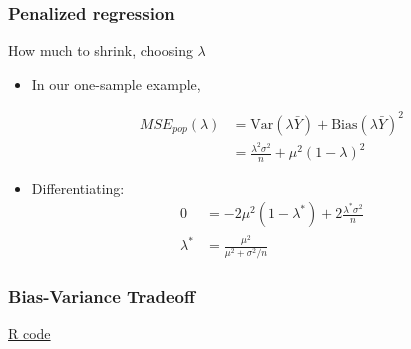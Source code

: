 \documentclass[handout]{beamer}
\newcommand{\V}{\text{Var}}
\begin{document}

   \begin{frame} \frametitle{Penalized regression}

   \begin{block}
         {How much to shrink, choosing $\lambda$}
         \begin{itemize}
         \item In our one-sample example,

   $$
   \begin{aligned}
   MSE_{pop}(\lambda) &= \V( \lambda \bar{Y}) + \text{Bias}(\lambda \bar{Y})^2 \\
   &= \frac{\lambda^2 \sigma^2}{n} + \mu^2 (1 - \lambda)^2
   \end{aligned}
   $$

   \item Differentiating:
   $$
   \begin{aligned}
   0 &= -2 \mu^2(1 - \lambda^*) + 2 \frac{\lambda^* \sigma^2}{n}  \\
   \lambda^* & = \frac{\mu^2}{\mu^2+\sigma^2/n}
   \end{aligned}
   $$
         \end{itemize}
   \end{block}
   \end{frame}



   \begin{frame}
   \frametitle{Bias-Variance Tradeoff}
   \begin{center}
   \end{center}
   \href{http://www.stanford.edu/class/stats191/selection.html#bias-variance-tradeoff}{R code}
   \end{frame}

\end{document}

